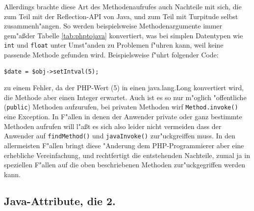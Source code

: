 Allerdings brachte diese Art des Methodenaufrufes auch Nachteile mit sich, die zum Teil mit der Reflection-API von Java,
und zum Teil mit Turpitude selbst zusammenh"angen. So werden beispielsweise Methodenargumente immer gem"a\ss  der Tabelle
\ref{tab:phptojava} konvertiert, was bei simplen Datentypen wie \texttt{int} und \texttt{float} unter Umst"anden zu Problemen f"uhren
kann, weil keine passende Methode gefunden wird. Beispielsweise f"uhrt folgender Code:

\begin{lstlisting}[caption=Typkonversionsfehler]
$date = $obj->setIntval(5);
\end{lstlisting}

zu einem Fehler, da der PHP-Wert (5) in einen java.lang.Long konvertiert wird, die Methode aber einen Integer erwartet.
Auch ist es so nur m"oglich "offentliche (\texttt{public}) Methoden aufzurufen,
bei privaten Methoden wirf \texttt{Method.invoke()} eine Exception.
In F"allen in denen der Anwender private oder ganz bestimmte Methoden aufrufen will l"a\ss t es sich also leider nicht vermeiden dass 
der Anwender auf \texttt{findMethod()} und \texttt{javaInvoke()} zur"uckgreiffen muss. In den allermeisten F"allen bringt diese "Anderung 
dem PHP-Programmierer aber eine erhebliche Vereinfachung, und rechtfertigt die entstehenden Nachteile, zumal ja in speziellen F"allen
auf die oben beschriebenen Methoden zur"uckgegriffen werden kann.

\subsection{Java-Attribute, die 2.}
\label{sec:chap1:impl:14}

